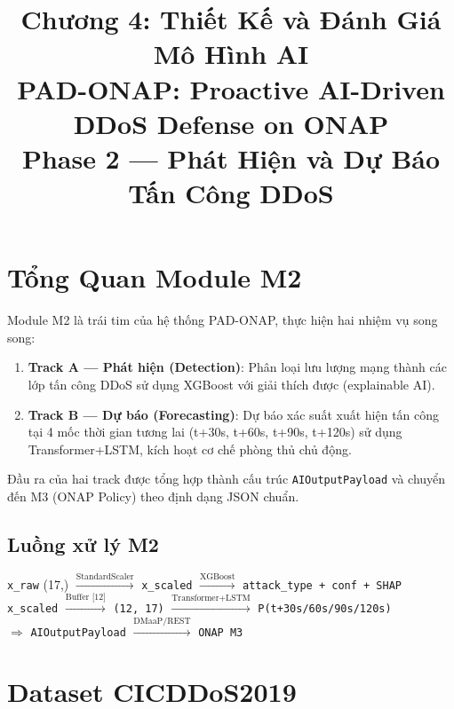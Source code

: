 \documentclass[12pt,a4paper]{article}
\title{\textbf{Chương 4: Thiết Kế và Đánh Giá Mô Hình AI}\\[0.4em]
\large PAD-ONAP: Proactive AI-Driven DDoS Defense on ONAP\\[0.3em]
\normalsize Phase 2 --- Phát Hiện và Dự Báo Tấn Công DDoS}
\author{}
\date{}
\begin{document}
\maketitle
\tableofcontents
\newpage

\section{Tổng Quan Module M2}

Module M2 là trái tim của hệ thống PAD-ONAP, thực hiện hai nhiệm vụ song song:

\begin{enumerate}[leftmargin=2em]
\item \textbf{Track A --- Phát hiện (Detection)}: Phân loại lưu lượng mạng thành các lớp tấn công DDoS sử dụng XGBoost với giải thích được (explainable AI).
\item \textbf{Track B --- Dự báo (Forecasting)}: Dự báo xác suất xuất hiện tấn công tại 4 mốc thời gian tương lai (t+30s, t+60s, t+90s, t+120s) sử dụng Transformer+LSTM, kích hoạt cơ chế phòng thủ chủ động.
\end{enumerate}

Đầu ra của hai track được tổng hợp thành cấu trúc \texttt{AIOutputPayload} và chuyển đến M3 (ONAP Policy) theo định dạng JSON chuẩn.

\subsection{Luồng xử lý M2}

\begin{center}
\small
\texttt{x\_raw} (17,) $\xrightarrow{\text{StandardScaler}}$ \texttt{x\_scaled}
$\xrightarrow{\text{XGBoost}}$ \texttt{attack\_type + conf + SHAP}\\[0.5em]
\texttt{x\_scaled} $\xrightarrow{\text{Buffer [12]}}$ \texttt{(12, 17)}
$\xrightarrow{\text{Transformer+LSTM}}$ \texttt{P(t+30s/60s/90s/120s)}\\[0.5em]
$\Rightarrow$ \texttt{AIOutputPayload} $\xrightarrow{\text{DMaaP/REST}}$ \texttt{ONAP M3}
\end{center}

\section{Dataset CICDDoS2019}
\end{document}
